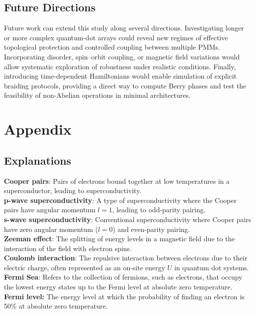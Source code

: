 \documentclass[11pt, letterpaper, titlepage]{article}
\begin{document}
\subsection{Future Directions}
Future work can extend this study along several directions. Investigating longer or more complex quantum-dot arrays could reveal new regimes of effective topological protection and controlled coupling between multiple PMMs. Incorporating disorder, spin–orbit coupling, or magnetic field variations would allow systematic exploration of robustness under realistic conditions. Finally, introducing time-dependent Hamiltonians would enable simulation of explicit braiding protocols, providing a direct way to compute Berry phases and test the feasibility of non-Abelian operations in minimal architectures.


\newpage
\section{Appendix}
\subsection{Explanations}

\textbf{Cooper pairs}: Pairs of electrons bound together at low temperatures in a superconductor, leading to superconductivity.\\
\textbf{p-wave superconductivity}: A type of superconductivity where the Cooper pairs have angular momentum \(l=1\), leading to odd-parity pairing.  \\
\textbf{s-wave superconductivity}: Conventional superconductivity where Cooper pairs have zero angular momentum (\(l=0\)) and even-parity pairing. \\
\textbf{Zeeman effect}: The splitting of energy levels in a magnetic field due to the interaction of the field with electron spins.\\
\textbf{Coulomb interaction}: The repulsive interaction between electrons due to their electric charge, often represented as an on-site energy \(U\) in quantum dot systems.\\
\textbf{Fermi Sea}: Refers to the collection of fermions, such as electrons, that occupy the lowest energy states up to the Fermi level at absolute zero temperature.\\
\textbf{Fermi level:} The energy level at which the probability of finding an electron is 50\% at absolute zero temperature.

\printbibliography[heading=bibintoc,title={References}]
\end{document}
